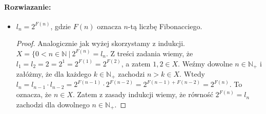 \documentclass{article}
\newenvironment{rozw}{\paragraph{Rozwiazanie:}}{\hfill}
\begin{document}
\begin{rozw}
\begin{itemize}
\begin{proof}
\begin{enumerate}
$$
h_{n+1} = h_n + (-1)^{n+2} \cdot (n+1) = \left( -1 \right)^{n+1} \cdot \lceil \frac{n}{2} \rceil + (-1)^{n+2} \cdot (n+1) = \left( -1 \right)^{2k+1} \cdot \lceil \frac{2k}{2} \rceil + (-1)^{2k+2} \cdot (2k+1) =
$$

$$
= -k + 2k +1 = k + 1 = (-1)^{(2k+1)+1} \lceil \frac{2k+1}{2} \rceil =  (-1)^{(n+1)+1} \lceil \frac{n+1}{2} \rceil
$$

\end{enumerate}

Zatem $n+1 \in X$, co pociąga za sobą (dla dowolnego $n \in \mathbb{N}_+$) równość z pierwszej linijki rozwiązania.

\end{proof}

\pagebreak

\item $l_n = 2^{F(n)}$, gdzie $F(n)$ oznacza $n$-tą liczbę Fibonacciego.

\begin{proof}
Analogicznie jak wyżej skorzystamy z indukcji. $X = \lbrace 0 < n \in \mathbb{N} \ | \ 2^{F(n)} = l_n$.
Z treści zadania wiemy, że $l_1 = l_2 = 2 = 2^1 = 2^{F(1)} = 2^{F(2)}$, a zatem $1,2 \in X$. Weźmy dowolne $n \in \mathbb{N}_+$ i załóżmy, że dla każdego $k \in \mathbb{N}_+$ zachodzi $n > k \in X$. Wtedy $l_n = l_{n-1} \cdot l_{n-2} = 2^{F(n-1)} \cdot 2^{F(n-2)} = 2^{F(n-1) + F(n-2)} = 2^{F(n)}$. To oznacza, że $n \in X$. Zatem z zasady indukcji wiemy, że równość $2^{F(n)} = l_n$ zachodzi dla dowolnego $n \in \mathbb{N}_+$.
\end{proof}


\end{itemize}
\end{rozw}

\end{document}
